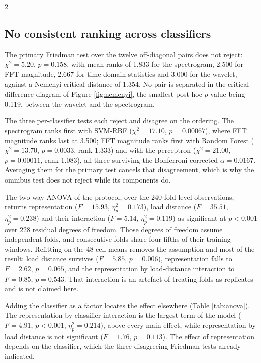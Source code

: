 \documentclass[12pt,twoside,titlepage]{ingenius}
\begin{document}
\begin{multicols}{2}
\raggedcolumns

\subsection{No consistent ranking across classifiers}

The primary Friedman test over the twelve off-diagonal pairs does not reject:
$\chi^2 = 5.20$, $p = 0.158$, with mean ranks of 1.833 for the spectrogram,
2.500 for FFT magnitude, 2.667 for time-domain statistics and 3.000 for the
wavelet, against a Nemenyi critical distance of 1.354. No pair is separated in
the critical difference diagram of Figure \ref{fig:nemenyi}, the smallest
post-hoc $p$-value being 0.119, between the wavelet and the spectrogram.

The three per-classifier tests each reject and disagree on the ordering. The
spectrogram ranks first with SVM-RBF ($\chi^2 = 17.10$, $p = 0.00067$), where
FFT magnitude ranks last at 3.500; FFT magnitude ranks first with Random Forest
($\chi^2 = 13.70$, $p = 0.0033$, rank 1.333) and with the perceptron
($\chi^2 = 21.00$, $p = 0.00011$, rank 1.083), all three surviving the
Bonferroni-corrected $\alpha = 0.0167$. Averaging them for the primary test
cancels that disagreement, which is why the omnibus test does not reject while
its components do.

The two-way ANOVA of the protocol, over the 240 fold-level observations, returns
representation ($F = 15.93$, $\eta^2_p = 0.173$), load distance ($F = 35.51$,
$\eta^2_p = 0.238$) and their interaction ($F = 5.14$, $\eta^2_p = 0.119$) as
significant at $p < 0.001$ over 228 residual degrees of freedom. Those degrees
of freedom assume independent folds, and consecutive folds share four fifths of
their training windows. Refitting on the 48 cell means removes the assumption
and most of the result: load distance survives ($F = 5.85$, $p = 0.006$),
representation falls to $F = 2.62$, $p = 0.065$, and the representation by
load-distance interaction to $F = 0.85$, $p = 0.543$. That interaction is an
artefact of treating folds as replicates and is not claimed here.

Adding the classifier as a factor locates the effect elsewhere (Table
\ref{tab:anova}). The representation by classifier interaction is the largest
term of the model ($F = 4.91$, $p < 0.001$, $\eta^2_p = 0.214$), above every main
effect, while representation by load distance is not significant ($F = 1.76$,
$p = 0.113$). The effect of representation depends on the classifier, which the
three disagreeing Friedman tests already indicated.


\end{multicols}
\end{document}
